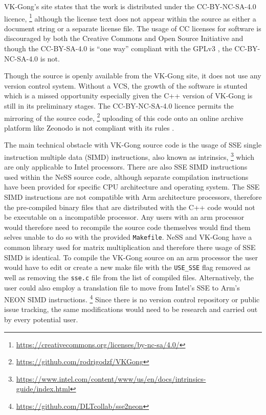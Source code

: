 VK-Gong's site states that the work is distributed under the CC-BY-NC-SA-4.0 licence,
\footnote{\url{https://creativecommons.org/licenses/by-nc-sa/4.0/}}
although the license text does not appear within the source as either a document string or a separate license file. The usage of CC licenses for software is discouraged by both the Creative Commons and Open Source Initiative and though the CC-BY-SA-4.0 is ``one way'' compliant with the GPLv3 \cite{cc_can_2025}, the CC-BY-NC-SA-4.0 is not.

Though the source is openly available from the VK-Gong site, it does not use any version control system. Without a VCS, the growth of the software is stunted which is a missed opportunity especially given the C\textsc{++} version of VK-Gong is still in its preliminary stages. The CC-BY-NC-SA-4.0 licence permits the mirroring of the source code,
\footnote{\url{https://github.com/rodrigodzf/VKGong}}
uploading of this code onto an online archive platform like Zeonodo is not compliant with its rules \cite{zenodo_metadata_2025}. 

The main technical obstacle with VK-Gong source code is the usage of SSE single instruction multiple data (SIMD) instructions, also known as intrinsics,
\footnote{\url{https://www.intel.com/content/www/us/en/docs/intrinsics-guide/index.html}}
which are only applicable to Intel processors. There are also SSE SIMD instructions used within the NeSS source code, although separate compilation instructions have been provided for specific CPU architecture and operating system. The SSE SIMD instructions are not compatible with Arm architecture processors, therefore the pre-compiled binary files that are distributed with the C\textsc{++} code would not be executable on a incompatible processor. Any users with an arm processor would therefore need to recompile the source code themselves would find them selves unable to do so with the provided \texttt{Makefile}. NeSS and VK-Gong have a common library used for matrix multiplication and therefore there usage of SSE SIMD is identical. To compile the VK-Gong source on an arm processor the user would have to edit or create a new make file with the \texttt{USE_SSE} flag removed as well as removing the \texttt{sse.c} file from the list of compiled files. Alternatively, the user could also employ a translation file to move from Intel's SSE to Arm's NEON SIMD instructions.
\footnote{\url{https://github.com/DLTcollab/sse2neon}}
Since there is no version control repository or public issue tracking, the same modifications would need to be research and carried out by every potential user.

